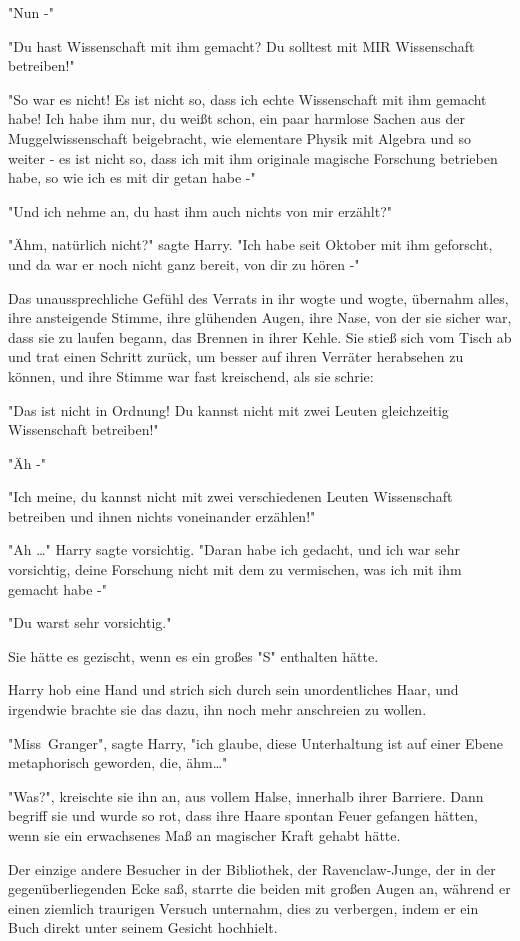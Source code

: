 {"Nun -"

"Du hast Wissenschaft mit ihm gemacht? Du solltest mit MIR Wissenschaft betreiben!"

"So war es nicht! Es ist nicht so, dass ich echte Wissenschaft mit ihm gemacht habe! Ich habe ihm nur, du weißt schon, ein paar harmlose Sachen aus der Muggelwissenschaft beigebracht, wie elementare Physik mit Algebra und so weiter - es ist nicht so, dass ich mit ihm originale magische Forschung betrieben habe, so wie ich es mit dir getan habe -"

"Und ich nehme an, du hast ihm auch nichts von mir erzählt?"

"Ähm, natürlich nicht?" sagte Harry. "Ich habe seit Oktober mit ihm geforscht, und da war er noch nicht ganz bereit, von dir zu hören -"

Das unaussprechliche Gefühl des Verrats in ihr wogte und wogte, übernahm alles, ihre ansteigende Stimme, ihre glühenden Augen, ihre Nase, von der sie sicher war, dass sie zu laufen begann, das Brennen in ihrer Kehle. Sie stieß sich vom Tisch ab und trat einen Schritt zurück, um besser auf ihren Verräter herabsehen zu können, und ihre Stimme war fast kreischend, als sie schrie:

"Das ist nicht in Ordnung! Du kannst nicht mit zwei Leuten gleichzeitig Wissenschaft betreiben!"

"Äh -"

"Ich meine, du kannst nicht mit zwei verschiedenen Leuten Wissenschaft betreiben und ihnen nichts voneinander erzählen!"

"Ah …" Harry sagte vorsichtig. "Daran habe ich gedacht, und ich war sehr vorsichtig, deine Forschung nicht mit dem zu vermischen, was ich mit ihm gemacht habe -"

"Du warst sehr vorsichtig."

Sie hätte es gezischt, wenn es ein großes "S" enthalten hätte.

Harry hob eine Hand und strich sich durch sein unordentliches Haar, und irgendwie brachte sie das dazu, ihn noch mehr anschreien zu wollen.

"Miss~Granger", sagte Harry, "ich glaube, diese Unterhaltung ist auf einer Ebene metaphorisch geworden, die, ähm…"

"Was?", kreischte sie ihn an, aus vollem Halse, innerhalb ihrer Barriere. Dann begriff sie und wurde so rot, dass ihre Haare spontan Feuer gefangen hätten, wenn sie ein erwachsenes Maß an magischer Kraft gehabt hätte.

Der einzige andere Besucher in der Bibliothek, der Ravenclaw-Junge, der in der gegenüberliegenden Ecke saß, starrte die beiden mit großen Augen an, während er einen ziemlich traurigen Versuch unternahm, dies zu verbergen, indem er ein Buch direkt unter seinem Gesicht hochhielt.

}
